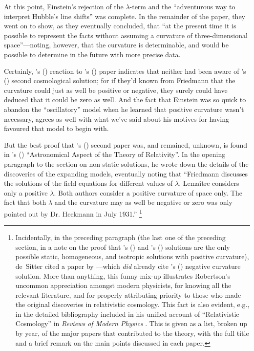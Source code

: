 \documentclass[12 pt]{article}
\def\citeapos#1{\citeauthor{#1}'s (\citeyear{#1})}
\begin{document}
At this point, Einstein's rejection of the $\lambda$-term and the ``adventurous way to interpret Hubble's line shifts'' was complete. In the remainder of the paper, they went on to show, as they eventually concluded, that ``at the present time it is possible to represent the facts without assuming a curvature of three-dimensional space''---noting, however, that the curvature is determinable, and would be possible to determine in the future with more precise data.

Certainly, \citeapos{Einstein1932} reaction to \citeapos{Heckmann1931} paper indicates that neither had been aware of \citeapos{Friedmann1924} second cosmological solution; for if they'd known from Friedmann that the curvature could just as well be positive or negative, they surely could have deduced that it could be zero as well. And the fact that Einstein was so quick to abandon the ``oscillatory'' model when he learned that positive curvature wasn't necessary, agrees as well with what we've said about his motives for having favoured that model to begin with.

But the best proof that \citeapos{Friedmann1924} second paper was, and remained, unknown, is found in \citeapos{deSitter1933} ``Astronomical Aspect of the Theory of Relativity''. In the opening paragraph to the section on non-static solutions, he wrote down the details of the discoveries of the expanding models, eventually noting that ``Friedmann discusses the solutions of the field equations for different values of $\lambda$. Lema\^{i}tre considers only a positive $\lambda$. Both authors consider a positive curvature of space only. The fact that both $\lambda$ and the curvature may as well be negative or zero was only pointed out by Dr. Heckmann in July 1931.'' \footnote{Incidentally, in the preceding paragraph (the last one of the preceding section, in a note on the proof that \citeapos{Einstein1917} and \citeapos{deSitter1917a,deSitter1917b} solutions are the only possible static, homogeneous, and isotropic solutions with positive curvature), de~Sitter cited a paper by \citep{Robertson1929}---which \textit{did} already cite \citeapos{Friedmann1924} negative curvature solution. More than anything, this funny mix-up illustrates Robertson's uncommon appreciation amongst modern physicists, for knowing all the relevant literature, and for properly attributing priority to those who made the original discoveries in relativistic cosmology. This fact is also evident, e.g., in the detailed bibliography included in his unified account of ``Relativistic Cosmology'' in \textit{Reviews of Modern Physics} \citep{Robertson1933}. This is given as a list, broken up by year, of the major papers that contributed to the theory, with the full title and a brief remark on the main points discussed in each paper.} 
\end{document}
